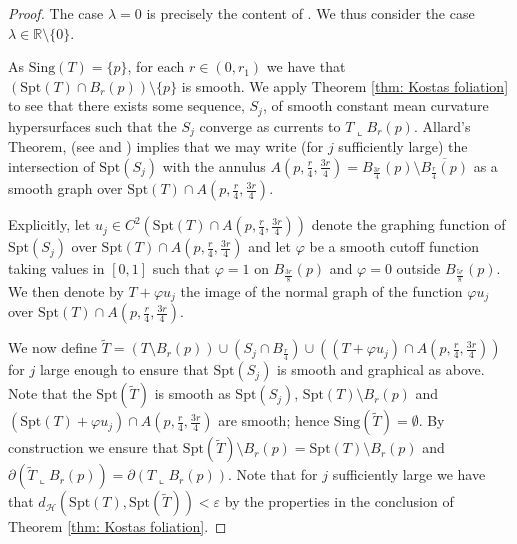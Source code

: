 \documentclass[11pt]{article}
\begin{document}
\begin{proof}
The case $\lambda = 0$ is precisely the content of \cite[Proposition 4.1]{C-L-S}. We thus consider the case $\lambda \in \mathbb{R} \setminus \{0\}$.

\bigskip

As $\mathrm{Sing}(T) = \{p\}$, for each $r \in (0,r_1)$ we have that $(\mathrm{Spt}(T) \cap B_r (p) ) \setminus \{ p \}$ is smooth. We apply Theorem \ref{thm: Kostas foliation} to see that there exists some sequence, $S_j$, of smooth constant mean curvature hypersurfaces such that the $S_j$ converge as currents to $T \llcorner B_r (p)$. Allard's Theorem, (see \cite[Chapter 5]{simongmt} and \cite[Lemma 1.14]{hardt-simon}) implies that we may write (for $j$ sufficiently large) the intersection of $\mathrm{Spt}(S_j)$ with the annulus $A(p, \frac{r}{4}, \frac{3r}{4}) = B_{\frac{3r}{4}}(p) \setminus \overline{B_{\frac{r}{4}}(p)}$ as a smooth graph over $\mathrm{Spt}(T) \cap A(p, \frac{r}{4}, \frac{3r}{4})$. 

\bigskip

Explicitly, let $u_j \in C^2(\mathrm{Spt}(T) \cap A(p, \frac{r}{4}, \frac{3r}{4}))$ denote the graphing function of $\mathrm{Spt}(S_j)$ over $\mathrm{Spt}(T) \cap A(p, \frac{r}{4}, \frac{3r}{4})$ and let $\varphi$ be a smooth cutoff function taking values in $[0,1]$ such that $\varphi = 1$ on $B_\frac{3r}{8}(p)$ and $\varphi = 0$ outside $B_\frac{5r}{8}(p)$. We then denote by $T + \varphi u_j$ the image of the normal graph of the function $\varphi u_j$ over $\mathrm{Spt}(T) \cap A(p, \frac{r}{4}, \frac{3r}{4})$.

\bigskip

We now define $\widetilde{T} = (T \setminus B_r(p)) \cup (S_j \cap B_\frac{r}{4}) \cup ((T + \varphi u_j) \cap A(p, \frac{r}{4}, \frac{3r}{4}))$ for $j$ large enough to ensure that $\mathrm{Spt}(S_j)$ is smooth and graphical as above. Note that the $\mathrm{Spt}(\widetilde{T})$ is smooth as $\mathrm{Spt}(S_j)$, $\mathrm{Spt}(T) \setminus B_r(p)$ and $(\mathrm{Spt}(T) + \varphi u_j) \cap A(p,\frac{r}{4}, \frac{3r}{4})$ are smooth; hence $\mathrm{Sing}(\widetilde{T}) = \emptyset$. By construction we ensure that $\mathrm{Spt}(\tilde{T}) \setminus B_r(p) = \mathrm{Spt}(T) \setminus B_r(p)$ and $\partial( \tilde{T} \llcorner B_r(p)) = \partial (T \llcorner B_r(p))$. Note that for $j$ sufficiently large we have that $d_{\mathcal{H}}(\mathrm{Spt}(T),\mathrm{Spt}(\tilde{T})) < \varepsilon$ by the properties in the conclusion of Theorem \ref{thm: Kostas foliation}.


\end{proof}
\end{document}
